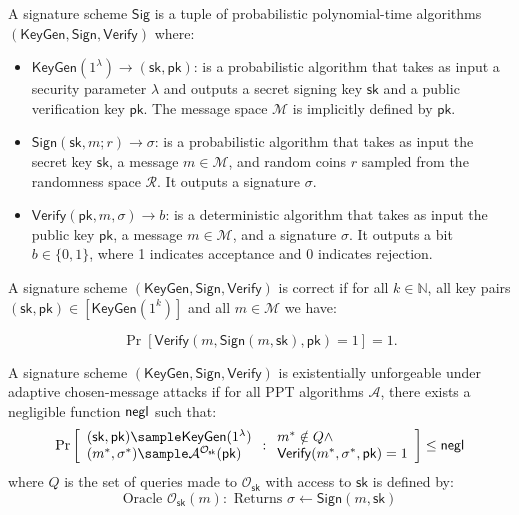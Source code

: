 \begin{definition}
A signature scheme $\mathsf{Sig}$ is a tuple of probabilistic polynomial-time algorithms $(\mathsf{KeyGen}, \mathsf{Sign}, \mathsf{Verify})$ where:

\begin{itemize}
    \item $\mathsf{KeyGen}(1^\lambda) \rightarrow (\mathsf{sk}, \mathsf{pk})$: is a probabilistic algorithm that takes as input a security parameter $\lambda$ and outputs a secret signing key $\mathsf{sk}$ and a public verification key $\mathsf{pk}$. The message space $\mathcal{M}$ is implicitly defined by $\mathsf{pk}$.
    
    \item $\mathsf{Sign}(\mathsf{sk}, m; r) \rightarrow \sigma$: is a probabilistic algorithm that takes as input the secret key $\mathsf{sk}$, a message $m \in \mathcal{M}$, and random coins $r$ sampled from the randomness space $\mathcal{R}$. It outputs a signature $\sigma$.
    
    \item $\mathsf{Verify}(\mathsf{pk}, m, \sigma) \rightarrow b$: is a deterministic algorithm that takes as input the public key $\mathsf{pk}$, a message $m \in \mathcal{M}$, and a signature $\sigma$. It outputs a bit $b \in \{0,1\}$, where 1 indicates acceptance and 0 indicates rejection.
\end{itemize}

\end{definition}

\begin{definition}[Correctness]
A signature scheme $(\mathsf{KeyGen}, \mathsf{Sign}, \mathsf{Verify})$ is correct if for all $k \in \mathbb{N}$, all key pairs $(\mathsf{sk}, \mathsf{pk}) \in [\mathsf{KeyGen}(1^k)]$ and all $m \in \mathcal{M}$ we have:

$$\Pr[\mathsf{Verify}(m, \mathsf{Sign}(m, \mathsf{sk}), \mathsf{pk}) = 1] = 1.$$
\end{definition}

\begin{definition}
A signature scheme $(\mathsf{KeyGen}, \mathsf{Sign}, \mathsf{Verify})$ is existentially unforgeable under adaptive chosen-message attacks if for all PPT algorithms $\mathcal{A}$, there exists a negligible function $\mathsf{negl}$ such that:
$$\Pr\left[\begin{array}{l}
    (\mathsf{sk}, \mathsf{pk}) \sample \mathsf{KeyGen}(1^\lambda) \\
    (m^*, \sigma^*) \sample \mathcal{A}^{\mathcal{O}_{\mathsf{sk}}}(\mathsf{pk})
\end{array} : \begin{array}{l}
    m^* \notin Q \land \\
    \mathsf{Verify}(m^*, \sigma^*, \mathsf{pk}) = 1
\end{array}\right] \leq \negl$$
where $Q$ is the set of queries made to $\mathcal{O}_{\mathsf{sk}}$ with access to $\mathsf{sk}$ is defined by:
\[
\text{Oracle }\mathcal{O}_{\mathsf{sk}}(m): \text{ Returns } \sigma \gets \mathsf{Sign}(m, \mathsf{sk})
\]
\end{definition}

